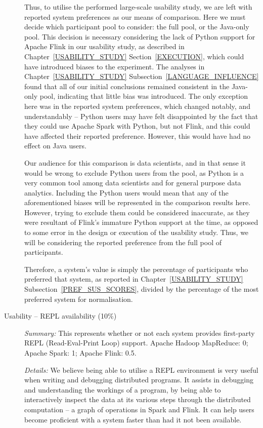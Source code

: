 \begin{description}
      Thus, to utilise the performed large-scale usability study, we are left with reported system preferences as our means of comparison. Here we must decide which participant pool to consider: the full pool, or the Java-only pool. This decision is necessary considering the lack of Python support for Apache Flink in our usability study, as described in Chapter~\ref{USABILITY_STUDY} Section~\ref{EXECUTION}, which could have introduced biases to the experiment. The analyses in Chapter~\ref{USABILITY_STUDY} Subsection~\ref{LANGUAGE_INFLUENCE} found that all of our initial conclusions remained consistent in the Java-only pool, indicating that little bias was introduced. The only exception here was in the reported system preferences, which changed notably, and understandably -- Python users may have felt disappointed by the fact that they could use Apache Spark with Python, but not Flink, and this could have affected their reported preference. However, this would have had no effect on Java users.

      Our audience for this comparison is data scientists, and in that sense it would be wrong to exclude Python users from the pool, as Python is a very common tool among data scientists and for general purpose data analytics. Including the Python users would mean that any of the aforementioned biases will be represented in the comparison results here. However, trying to exclude them could be considered inaccurate, as they were resultant of Flink's immature Python support at the time, as opposed to some error in the design or execution of the usability study. Thus, we will be considering the reported preference from the full pool of participants.

      Therefore, a system's value is simply the percentage of participants who preferred that system, as reported in Chapter~\ref{USABILITY_STUDY} Subsection~\ref{PREF_SUS_SCORES}, divided by the percentage of the most preferred system for normalisation.

    \item[Usability -- REPL availability (10\%)]
      \textit{Summary:} This represents whether or not each system provides first-party REPL (Read-Eval-Print Loop) support. Apache Hadoop MapReduce: 0; Apache Spark: 1; Apache Flink: 0.5.\medskip

      \textit{Details:} We believe being able to utilise a REPL environment is very useful when writing and debugging distributed programs. It assists in debugging and understanding the workings of a program, by being able to interactively inspect the data at its various steps through the distributed computation -- a graph of operations in Spark and Flink. It can help users become proficient with a system faster than had it not been available.


\end{description}
